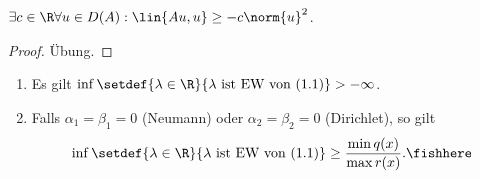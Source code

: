 \begin{lem}
\label{prop:1.40}
$\exists c\in\R \forall u\in D(A) : \lin{Au,u} \ge -c\norm{u}^2$.\fishhere
\end{lem}
\begin{proof}
Übung.\qedhere
\end{proof}

\begin{prop}
\label{prop:1.41}
\begin{enumerate}[label=\arabic{*}.)]
\item Es gilt $\inf\setdef{\lambda\in\R}{\lambda\text{ ist EW von (1.1)}} >
-\infty$.
\item Falls $\alpha_1 = \beta_1 = 0$ (Neumann) oder $\alpha_2=\beta_2=0$
(Dirichlet), so gilt
\begin{align*}
\inf\setdef{\lambda\in\R}{\lambda\text{ ist EW von (1.1)}} \ge \frac{\min
q(x)}{\max r(x)}.\fishhere
\end{align*}
\end{enumerate}
\end{prop}

